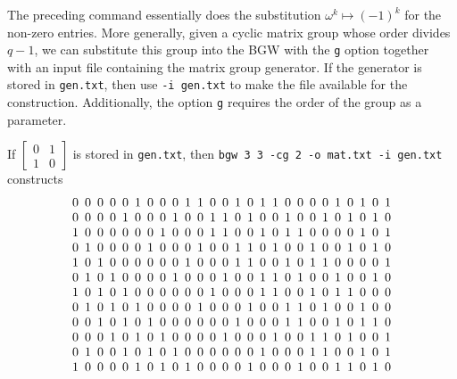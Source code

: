 \documentclass[a4paper,10pt]{article}
\begin{document}
The preceding command essentially does the substitution $\omega^k \mapsto (-1)^k$ for the non-zero entries. More generally, given a cyclic matrix group whose order divides $q-1$, we can substitute this group into the BGW with the {\tt g} option together with an input file containing the matrix group generator. If the generator is stored in {\tt gen.txt}, then use {\tt -i gen.txt} to make the file available for the construction. Additionally, the option {\tt g} requires the order of the group as a parameter.

If $\left[\begin{smallmatrix}0&1\\1&0\end{smallmatrix}\right]$ is stored in {\tt gen.txt}, then {\tt bgw 3 3 -cg 2 -o mat.txt -i gen.txt} constructs
\[
\arraycolsep=2.5pt\def\arraystretch{1.0}
 \begin{array}{rrrrrrrrrrrrrrrrrrrrrrrrrr}
0 & 0 & 0 & 0 & 0 & 1 & 0 & 0 & 0 & 1 & 1 & 0 & 0 & 1 & 0 & 1 & 1 & 0 & 0 & 0 & 0 & 1 & 0 & 1 & 0 & 1 \\
0 & 0 & 0 & 0 & 1 & 0 & 0 & 0 & 1 & 0 & 0 & 1 & 1 & 0 & 1 & 0 & 0 & 1 & 0 & 0 & 1 & 0 & 1 & 0 & 1 & 0 \\
1 & 0 & 0 & 0 & 0 & 0 & 0 & 1 & 0 & 0 & 0 & 1 & 1 & 0 & 0 & 1 & 0 & 1 & 1 & 0 & 0 & 0 & 0 & 1 & 0 & 1 \\
0 & 1 & 0 & 0 & 0 & 0 & 1 & 0 & 0 & 0 & 1 & 0 & 0 & 1 & 1 & 0 & 1 & 0 & 0 & 1 & 0 & 0 & 1 & 0 & 1 & 0 \\
1 & 0 & 1 & 0 & 0 & 0 & 0 & 0 & 0 & 1 & 0 & 0 & 0 & 1 & 1 & 0 & 0 & 1 & 0 & 1 & 1 & 0 & 0 & 0 & 0 & 1 \\
0 & 1 & 0 & 1 & 0 & 0 & 0 & 0 & 1 & 0 & 0 & 0 & 1 & 0 & 0 & 1 & 1 & 0 & 1 & 0 & 0 & 1 & 0 & 0 & 1 & 0 \\
1 & 0 & 1 & 0 & 1 & 0 & 0 & 0 & 0 & 0 & 0 & 1 & 0 & 0 & 0 & 1 & 1 & 0 & 0 & 1 & 0 & 1 & 1 & 0 & 0 & 0 \\
0 & 1 & 0 & 1 & 0 & 1 & 0 & 0 & 0 & 0 & 1 & 0 & 0 & 0 & 1 & 0 & 0 & 1 & 1 & 0 & 1 & 0 & 0 & 1 & 0 & 0 \\
0 & 0 & 1 & 0 & 1 & 0 & 1 & 0 & 0 & 0 & 0 & 0 & 0 & 1 & 0 & 0 & 0 & 1 & 1 & 0 & 0 & 1 & 0 & 1 & 1 & 0 \\
0 & 0 & 0 & 1 & 0 & 1 & 0 & 1 & 0 & 0 & 0 & 0 & 1 & 0 & 0 & 0 & 1 & 0 & 0 & 1 & 1 & 0 & 1 & 0 & 0 & 1 \\
0 & 1 & 0 & 0 & 1 & 0 & 1 & 0 & 1 & 0 & 0 & 0 & 0 & 0 & 0 & 1 & 0 & 0 & 0 & 1 & 1 & 0 & 0 & 1 & 0 & 1 \\
1 & 0 & 0 & 0 & 0 & 1 & 0 & 1 & 0 & 1 & 0 & 0 & 0 & 0 & 1 & 0 & 0 & 0 & 1 & 0 & 0 & 1 & 1 & 0 & 1 & 0 \\

\end{array}\]
\end{document}
